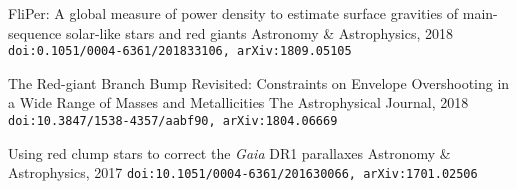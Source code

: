 \documentclass[]{k-cv} %
\begin{document}
{FliPer: A global measure of power density to estimate surface gravities of main-sequence solar-like stars and red giants}
{Astronomy \& Astrophysics, 2018}
{\texttt{doi:0.1051/0004-6361/201833106, arXiv:1809.05105}}

{The Red-giant Branch Bump Revisited: Constraints on Envelope Overshooting in a Wide Range of Masses and Metallicities}
{The Astrophysical Journal, 2018}
{\texttt{doi:10.3847/1538-4357/aabf90, arXiv:1804.06669}}

{Using red clump stars to correct the \emph{Gaia} DR1 parallaxes}
{Astronomy \& Astrophysics, 2017}
{\texttt{doi:10.1051/0004-6361/201630066, arXiv:1701.02506}}
\end{document}
